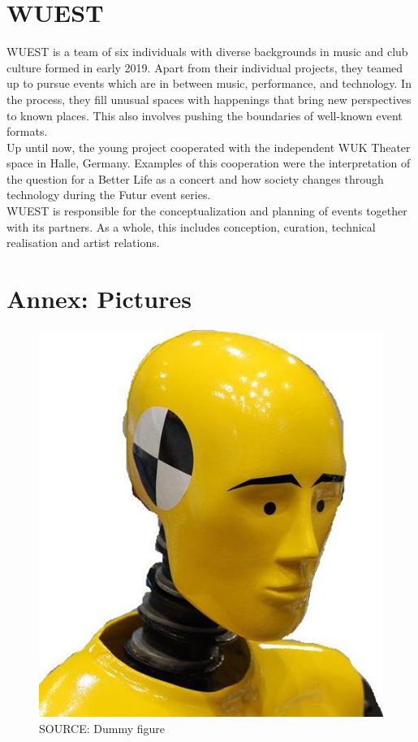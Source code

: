 \documentclass[a4paper, 11pt]{memoir}
\begin{document}
    \section*{WUEST}
    WUEST is a team of six individuals with diverse backgrounds in music and club 
    culture formed in early 2019. Apart from their individual projects, they 
    teamed up to pursue events which are in between music, performance, and 
    technology. In the process, they fill unusual spaces with happenings that 
    bring new perspectives to known places. This also involves pushing the boundaries 
    of well-known event formats. \\
    Up until now, the young project cooperated with the independent WUK Theater space 
    in Halle, Germany. Examples of this cooperation were the interpretation of the
    question for a Better Life as a concert and how society changes through 
    technology during the Futur event series. \\
    WUEST is responsible for the conceptualization and planning of events together 
    with its partners. As a whole, this includes conception, curation, technical 
    realisation and artist relations.


    \section*{Annex: Pictures}

    \begin{figure}
        \includegraphics[scale=1.0]{dummy_web_page.jpg}
        \caption{SOURCE: Dummy figure}
    \end{figure}
\end{document}
